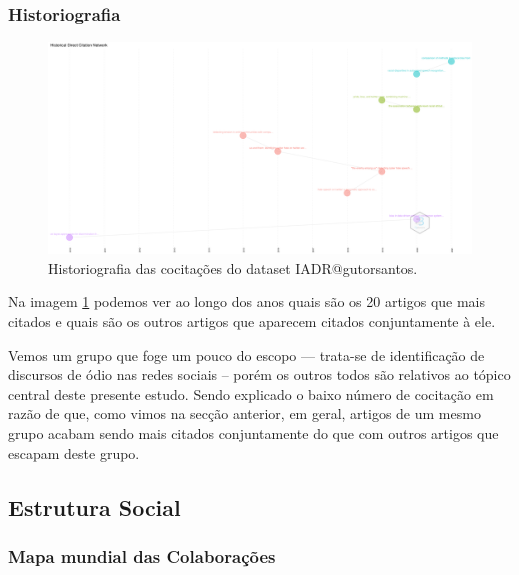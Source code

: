 \subsubsection{Historiografia}
\begin{figure}[H]
    \centering
\includegraphics[angle=0,width=1\textwidth]{experiments/gutorsantos/AnaliseBibliometrica/IAeDiscriminacao/imgs/Historiograph-2022-02-09.png}
    \caption{Historiografia das cocitações do dataset IADR@gutorsantos.}
    \label{fig:IADR@gutorsantos:Historiograph}
\end{figure}

Na imagem \ref{fig:IADR@gutorsantos:Historiograph} podemos ver ao longo dos anos quais são os 20 artigos que mais citados e quais são os outros artigos que aparecem citados  conjuntamente à ele. 

Vemos um grupo que foge um pouco do escopo --- trata-se de identificação de discursos de ódio nas redes sociais -- porém os outros todos são relativos ao tópico central deste presente estudo. Sendo explicado o baixo número de cocitação em razão de que, como vimos na secção anterior, em geral, artigos de um mesmo grupo acabam sendo mais citados conjuntamente do que com outros artigos que escapam deste grupo.


\subsection{Estrutura Social}

\subsubsection{Mapa mundial das Colaborações}

